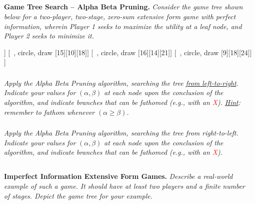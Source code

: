 \documentclass[12pt]{amsart}
\begin{document}
\subsection{}
\textbf{Game Tree Search – Alpha Beta Pruning.} 
\textit{Consider the game tree shown below for a two-player, two-stage, 
	zero-sum extensive form game with perfect information, wherein Player
	1 seeks to maximize the utility at a leaf node, and Player 2 seeks to minimize it.}
	\begin{center}
	\begin{forest}
		[\textcolor{white}{1}, circle, fill=ForestGreen, draw, delay={for children={fill=Maroon}}
			[\textcolor{white}2, circle, draw
				[15][33][12]]
			[\textcolor{white}2, circle, draw
				[15][10][18]]
			[\textcolor{white}2, circle, draw
				[16][14][21]]
			[\textcolor{white}2, circle, draw
				[9][18][24]]
		]
	\end{forest}
	\end{center}
	
\subsubsection{}
\textit{Apply the Alpha Beta Pruning algorithm, searching the tree \underline{from left-to-right}. Indicate
	your values for $(\alpha,\beta)$ at each node upon the conclusion of the algorithm, and indicate
	branches that can be fathomed (e.g., with an \textcolor{red}{X}). \underline{Hint}: remember to fathom whenever
	$(\alpha\geq\beta)$.}
	
\subsubsection{}
\textit{Apply the Alpha Beta Pruning algorithm, searching the tree from right-to-left. Indicate
	your values for $(\alpha,\beta)$ at each node upon the conclusion of the algorithm, and indicate
	branches that can be fathomed (e.g., with an \textcolor{red}{X}).	}
	
	
\subsection{}
\textbf{Imperfect Information Extensive Form Games.} 
\textit{Describe a real-world example of such a game. It should have at least two players 
	and a finite number of stages. Depict the game tree for your example.}
\end{document}
